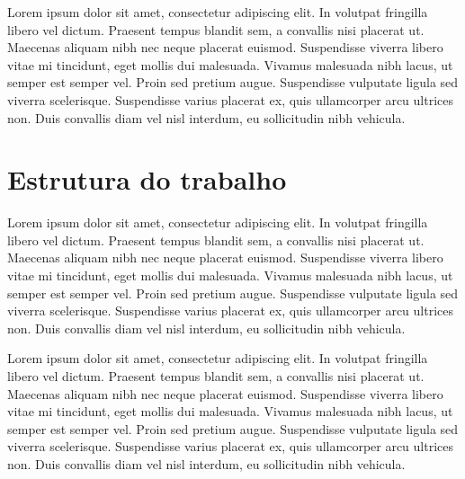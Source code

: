 Lorem ipsum dolor sit amet, consectetur adipiscing elit. In volutpat fringilla libero vel dictum. Praesent tempus blandit sem, a convallis nisi placerat ut. Maecenas aliquam nibh nec neque placerat euismod. Suspendisse viverra libero vitae mi tincidunt, eget mollis dui malesuada. Vivamus malesuada nibh lacus, ut semper est semper vel. Proin sed pretium augue. Suspendisse vulputate ligula sed viverra scelerisque. Suspendisse varius placerat ex, quis ullamcorper arcu ultrices non. Duis convallis diam vel nisl interdum, eu sollicitudin nibh vehicula.

\section{Estrutura do trabalho}

Lorem ipsum dolor sit amet, consectetur adipiscing elit. In volutpat fringilla libero vel dictum. Praesent tempus blandit sem, a convallis nisi placerat ut. Maecenas aliquam nibh nec neque placerat euismod. Suspendisse viverra libero vitae mi tincidunt, eget mollis dui malesuada. Vivamus malesuada nibh lacus, ut semper est semper vel. Proin sed pretium augue. Suspendisse vulputate ligula sed viverra scelerisque. Suspendisse varius placerat ex, quis ullamcorper arcu ultrices non. Duis convallis diam vel nisl interdum, eu sollicitudin nibh vehicula.

Lorem ipsum dolor sit amet, consectetur adipiscing elit. In volutpat fringilla libero vel dictum. Praesent tempus blandit sem, a convallis nisi placerat ut. Maecenas aliquam nibh nec neque placerat euismod. Suspendisse viverra libero vitae mi tincidunt, eget mollis dui malesuada. Vivamus malesuada nibh lacus, ut semper est semper vel. Proin sed pretium augue. Suspendisse vulputate ligula sed viverra scelerisque. Suspendisse varius placerat ex, quis ullamcorper arcu ultrices non. Duis convallis diam vel nisl interdum, eu sollicitudin nibh vehicula.